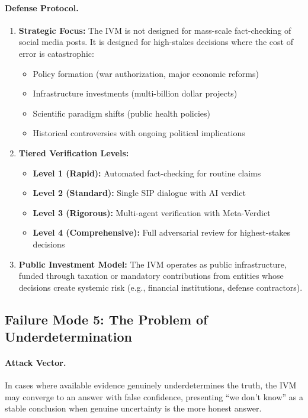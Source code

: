 \documentclass[11pt,a4paper]{article}
\begin{document}
\paragraph{Defense Protocol.}

\begin{enumerate}
    \item \textbf{Strategic Focus:} The IVM is not designed for mass-scale fact-checking of social media posts. It is designed for high-stakes decisions where the cost of error is catastrophic:
    \begin{itemize}
        \item Policy formation (war authorization, major economic reforms)
        \item Infrastructure investments (multi-billion dollar projects)
        \item Scientific paradigm shifts (public health policies)
        \item Historical controversies with ongoing political implications
    \end{itemize}
    
    \item \textbf{Tiered Verification Levels:}
    \begin{itemize}
        \item \textbf{Level 1 (Rapid):} Automated fact-checking for routine claims
        \item \textbf{Level 2 (Standard):} Single SIP dialogue with AI verdict
        \item \textbf{Level 3 (Rigorous):} Multi-agent verification with Meta-Verdict
        \item \textbf{Level 4 (Comprehensive):} Full adversarial review for highest-stakes decisions
    \end{itemize}
    
    \item \textbf{Public Investment Model:} The IVM operates as public infrastructure, funded through taxation or mandatory contributions from entities whose decisions create systemic risk (e.g., financial institutions, defense contractors).
\end{enumerate}

\subsection{Failure Mode 5: The Problem of Underdetermination}

\paragraph{Attack Vector.} In cases where available evidence genuinely underdetermines the truth, the IVM may converge to an answer with false confidence, presenting ``we don't know'' as a stable conclusion when genuine uncertainty is the more honest answer.
\end{document}
